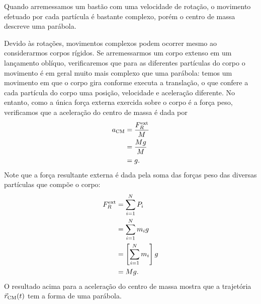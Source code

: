 \begin{marginfigure}
\centering
{}
\caption{Quando arremessamos um bastão com uma velocidade de rotação, o movimento efetuado por cada partícula é bastante complexo, porém o centro de massa descreve uma parábola.\label{Fig:BastaoArremessadoGirandoLancObliquo}}
\end{marginfigure}

Devido às rotações, movimentos complexos podem ocorrer mesmo ao considerarmos corpos rígidos. Se arremessarmos um corpo extenso em um lançamento oblíquo, verificaremos que para as diferentes partículas do corpo o movimento é em geral muito mais complexo que uma parábola: temos um movimento em que o corpo gira conforme executa a translação, o que confere a cada partícula do corpo uma posição, velocidade e aceleração diferente. No entanto, como a única força externa exercida sobre o corpo é a força peso, verificamos que a aceleração do centro de massa é dada por
\begin{align}
    a_{\rm{CM}} &= \frac{F_R^{\rm{ext}}}{M} \\
    &= \frac{Mg}{M} \\
    &= g.
\end{align}
%
Note que a força resultante externa é dada pela soma das forças peso das diversas partículas que compõe o corpo:
\begin{align}
    F_R^{\rm{ext}} &= \sum_{i=1}^N P_i \\
    &= \sum_{i=1}^N m_i g \\
    &= \left[\sum_{i=1}^N m_i\right] g \\
    &= M g.
\end{align}
%
O resultado acima para a aceleração do centro de massa mostra que a trajetória $\vec{r}_{\rm{CM}}(t)$ tem a forma de uma parábola.


